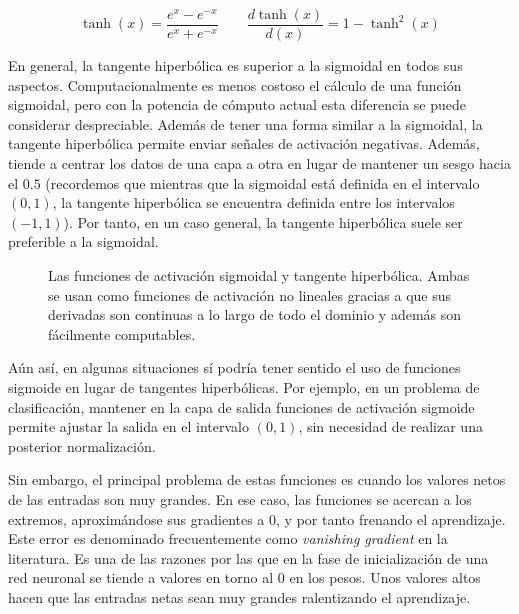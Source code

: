 \begin{equation}
	\tanh(x) = \frac{e^x - e^{-x}}{e^x+e^{-x}} \qquad
	\frac{d\tanh (x)}{d(x)} = 1 - \tanh^2(x)
	\label{eq:tanh}
\end{equation}

En general, la tangente hiperbólica es superior a la sigmoidal en todos sus aspectos. Computacionalmente es menos costoso el cálculo de una función sigmoidal, pero con la potencia de cómputo actual esta diferencia se puede considerar despreciable. Además de tener una forma similar a la sigmoidal, la tangente hiperbólica permite enviar señales de activación negativas. Además, tiende a centrar los datos de una capa a otra en lugar de mantener un sesgo hacia el $0.5$ (recordemos que mientras que la sigmoidal está definida en el intervalo $(0, 1)$, la tangente hiperbólica se encuentra definida entre los intervalos $(-1, 1)$). Por tanto, en un caso general, la tangente hiperbólica suele ser preferible a la sigmoidal.

\begin{figure}[t]
	\centering
	\qquad
	\caption[Funciones de activación: sigmoide y tangente hiperbólica]{Las funciones de activación sigmoidal y tangente hiperbólica. Ambas se usan como funciones de activación no lineales gracias a que sus derivadas son continuas a lo largo de todo el dominio y además son fácilmente computables.}
	\label{fig:sig-and-tanh}
\end{figure}

Aún así, en algunas situaciones sí podría tener sentido el uso de funciones sigmoide en lugar de tangentes hiperbólicas. Por ejemplo, en un problema de clasificación, mantener en la capa de salida funciones de activación sigmoide permite ajustar la salida en el intervalo $(0, 1)$, sin necesidad de realizar una posterior normalización.

Sin embargo, el principal problema de estas funciones es cuando los valores netos de las entradas son muy grandes. En ese caso, las funciones se acercan a los extremos, aproximándose sus gradientes a $0$, y por tanto frenando el aprendizaje. Este error es denominado frecuentemente como \textit{vanishing gradient} en la literatura. Es una de las razones por las que en la fase de inicialización de una red neuronal se tiende a valores en torno al $0$ en los pesos. Unos valores altos hacen que las entradas netas sean muy grandes ralentizando el aprendizaje.


